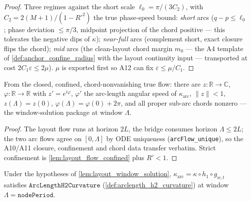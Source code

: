 \begin{proof}
  \leanok
  Three regimes against the short scale $\ell_0=\pi/(3C_2)$, with
  $C_2=2(M+1)/(1-R'^2)$ the true phase-speed bound: \emph{short} arcs
  ($q-p\le\ell_0$; phase deviation $\le\pi/3$, midpoint projection of the
  chord positive — this tolerates the negative dips of $\kappa$);
  \emph{near-full} arcs (complement short, exact closure flips the chord);
  \emph{mid} arcs (the clean-layout chord margin $m_0$ — the A4 template of
  \cref{def:anchor_confine_radius} with the layout continuity input —
  transported at cost $2C_1\varepsilon\le2\mu$).  $\mu$ is exported first so
  A12 can fix $\varepsilon\le\mu/C_1$.
\end{proof}

\begin{lemma}
  \label{lem:layout_window_solution}
  From the closed, confined, chord-nonvanishing true flow: there are
  $z:\mathbb R\to\mathbb C$, $\varphi:\mathbb R\to\mathbb R$ with
  $z'=e^{i\varphi}$, $\varphi'$ the arc-length angular speed of
  $\kappa_{\mathrm{arc}}$, $\|z\|<1$, $z(\Lambda)=z(0)$,
  $\varphi(\Lambda)=\varphi(0)+2\pi$, and all proper sub-arc chords nonzero —
  the window-solution package at window $\Lambda$.
\end{lemma}

\begin{proof}
  \leanok
  The layout flow runs at horizon $2L$, the bridge consumes horizon
  $\Lambda\le2L$; the two arc flows agree on $[0,\Lambda]$ by ODE uniqueness
  (\texttt{arcFlow\_unique}), so the A10/A11 closure, confinement and chord
  data transfer verbatim.  Strict confinement is
  \cref{lem:layout_flow_confined} plus $R'<1$.
\end{proof}

\begin{lemma}
  \label{lem:layout_arclength_h2}
  Under the hypotheses of \cref{lem:layout_window_solution},
  $\kappa_{\mathrm{arc}}=\kappa\circ h_1\circ g_{w,t}$ satisfies
  $\texttt{ArcLengthH2Curvature}$ (\cref{def:arclength_h2_curvature}) at
  window $\Lambda=\texttt{nodePeriod}$.
\end{lemma}


